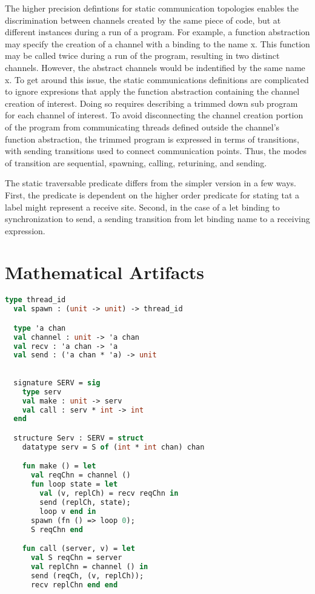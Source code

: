 \documentclass{article}
\begin{document}
The higher precision defintions for static communication topologies enables the discrimination
between channels created by the same piece of code, but at different instances during a run of
a program.  For example, a function abstraction may specify the creation of a channel with a
binding to the name x.  This function may be called twice during a run of the program,
resulting in two distinct channels.  However, the abstract channels would be indentified by the
same name x.  To get around this issue, the static communications definitions are complicated
to ignore expresions that apply the function abstraction containing the channel creation of
interest.  Doing so requires describing a trimmed down sub program for each channel of
interest.  To avoid disconnecting the channel creation portion of the program from
communicating threads defined outside the channel's function abstraction, the trimmed program
is expressed in terms of transitions, with sending transitions used to connect communication
points. Thus, the modes of transition are sequential, spawning, calling, returining, and
sending. 


The static traversable predicate differs from the simpler version in a few ways.  First, the
predicate is dependent on the higher order predicate for stating tat a label might represent a
receive site.  Second, in the case of a let binding to synchronization to send, a sending
transition from let binding name to a receiving expression.






\section{Mathematical Artifacts}

\begin{lstlisting}[language=ML, style=codestyle1]
  type thread_id
  val spawn : (unit -> unit) -> thread_id

  type 'a chan
  val channel : unit -> 'a chan
  val recv : 'a chan -> 'a
  val send : ('a chan * 'a) -> unit
  \end{lstlisting}

\begin{lstlisting}[language=ML, style=codestyle1]

  signature SERV = sig 
    type serv
    val make : unit -> serv
    val call : serv * int -> int
  end

  structure Serv : SERV = struct 
    datatype serv = S of (int * int chan) chan 

    fun make () = let 
      val reqChn = channel ()
      fun loop state = let
        val (v, replCh) = recv reqChn in 
        send (replCh, state);
        loop v end in
      spawn (fn () => loop 0);
      S reqChn end 

    fun call (server, v) = let 
      val S reqChn = server
      val replChn = channel () in 
      send (reqCh, (v, replCh));
      recv replChn end end

  \end{lstlisting}
\end{document}
